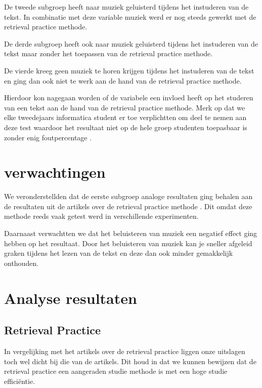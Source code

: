 \documentclass{hogent-article}
\begin{document}
	De tweede subgroep heeft naar muziek geluisterd tijdens het instuderen van de tekst. In combinatie met deze variable muziek werd er nog steeds gewerkt met de retrieval practice methode.
	
	De derde subgroep heeft ook naar muziek geluisterd tijdens het instuderen van de tekst maar zonder het toepassen van de retrieval practice methode.
	
	De vierde kreeg geen muziek te horen krijgen tijdens het instuderen van de tekst en ging dan ook niet te werk aan de hand van de retrieval practice methode.
	
	Hierdoor kon nagegaan worden of de variabele een invloed heeft op het studeren van een tekst aan de hand van de retrieval practice methode. Merk op dat we elke tweedejaars informatica student er toe verplichtten om deel te nemen aan deze test waardoor het resultaat niet op de hele groep studenten toepasbaar is zonder enig foutpercentage \autocite{karpicke2009metacognitive}.
	
	\section{verwachtingen}
	We veronderstellden dat de eerste subgroep analoge resultaten ging behalen aan de resultaten uit de artikels over de retrieval practice methode \autocite{butler2010repeated, pyc2012test, karpicke2007repeated, karpicke2008critical}. Dit omdat deze methode reeds vaak getest werd in verschillende experimenten.
	
	Daarnaast verwachtten we dat het beluisteren van muziek een negatief effect ging hebben op het resultaat. Door het beluisteren van muziek kan je sneller afgeleid graken tijdens het lezen van de tekst en deze dan ook minder gemakkelijk onthouden.
	
	\section{Analyse resultaten}
	\subsection{Retrieval Practice}
	In vergelijking met het artikels over de retrieval practice \autocite{butler2010repeated, pyc2012test, karpicke2007repeated, karpicke2008critical} liggen onze uitslagen toch wel dicht bij die van de artikels. Dit houd in dat we kunnen bewijzen dat de retrieval practice een aangeraden studie methode is met een hoge studie efficiëntie.
	
\end{document}
